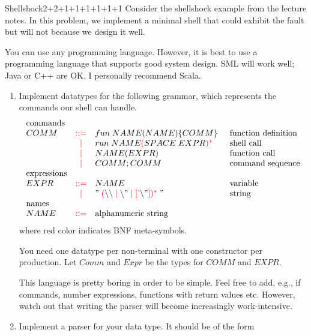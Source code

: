\documentclass[a4paper]{article}
\begin{document}
\header

\begin{problem}{Shellshock}{2+2+1+1+1+1+1+1}
Consider the shellshock example from the lecture notes.
In this problem, we implement a minimal shell that could exhibit the fault but will not because we design it well.

You can use any programming language.
However, it is best to use a programming language that supports good system design.
SML will work well; Java or C++ are OK. I personally recommend Scala.

\renewcommand{\bnf}[1]{{\color{red}#1}}
\begin{enumerate}
\item Implement datatypes for the following grammar, which represents the commands our shell can handle.
\[\begin{array}{lcl@{\tb}l}
 \text{commands} \\
 COMM & \bbc & fun\;NAME(NAME) \{COMM\} & \text{function definition} \\
      & \bnfalt & run\;NAME \rep{\bnfbracket{SPACE\; EXPR}} & \text{shell call}\\
      & \bnfalt & NAME(EXPR) & \text{function call}\\
      & \bnfalt & COMM ; COMM & \text{command sequence}\\
 \text{expressions} \\
 EXPR & \bbc & NAME & \text{variable} \\
      & \bnfalt& "\; \rep{\bnfbracket{\backslash\backslash \bnfalt \backslash" \bnfalt \bnfnegchoice{\backslash"}}} \;" & \text{string} \\
 \text{names} \\
 NAME & \bbc & \text{alphanumeric string} &
\end{array}\]
where red color indicates BNF meta-symbols.

You need one datatype per non-terminal with one constructor per production.
Let $Comm$ and $Expr$ be the types for $COMM$ and $EXPR$.

This language is pretty boring in order to be simple.
Feel free to add, e.g., if commands, number expressions, functions with return values etc.
However, watch out that writing the parser will become increasingly work-intensive.

\item Implement a parser for your data type. It should be of the form
\begin{acode}
\\
\end{acode}


\end{enumerate}
\end{problem}
\end{document}
